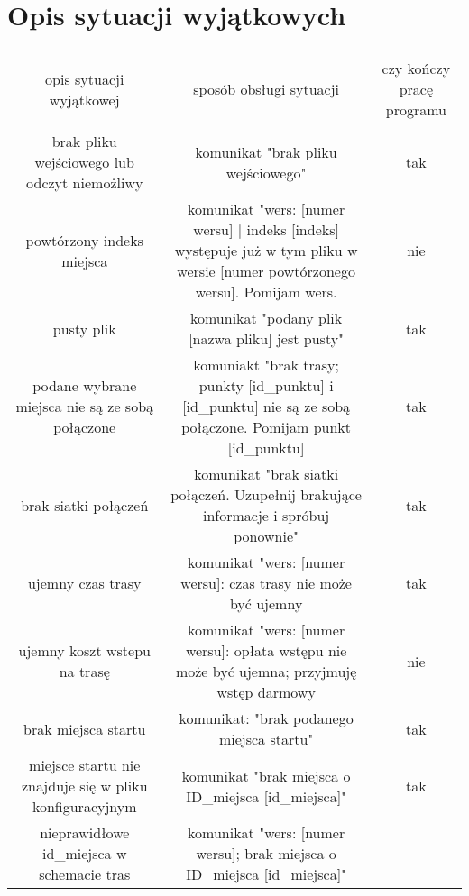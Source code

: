 \documentclass{article}
\begin{document}
\section{Opis sytuacji wyjątkowych}
\begin{tabular}{|c|c|c|} \hline
& & \\
opis sytuacji wyjątkowej & sposób obsługi sytuacji & czy kończy pracę programu \\ 
& & \\ \hline
brak pliku wejściowego lub odczyt niemożliwy & komunikat "brak pliku wejściowego" & tak\\ \hline
powtórzony indeks miejsca & komunikat "wers: [numer wersu] | indeks [indeks] występuje już w tym pliku w wersie [numer powtórzonego wersu]. Pomijam wers. & nie \\ \hline
pusty plik & komunikat "podany plik [nazwa pliku] jest pusty" & tak \\ \hline
podane wybrane miejsca nie są ze sobą połączone & komuniakt "brak trasy; punkty [id_punktu] i [id_punktu] nie są ze sobą połączone. Pomijam punkt [id_punktu] & tak \\ \hline
brak siatki połączeń & komunikat "brak siatki połączeń. Uzupełnij brakujące informacje i spróbuj ponownie" & tak\\ \hline
ujemny czas trasy & komunikat "wers: [numer wersu]: czas trasy nie może być ujemny & tak \\ \hline
ujemny koszt wstepu na trasę & komunikat "wers: [numer wersu]: opłata wstępu nie może być ujemna; przyjmuję wstęp darmowy  & nie \\ \hline
brak miejsca startu & komunikat: "brak podanego miejsca startu" & tak \\ \hline
miejsce startu nie znajduje się w pliku konfiguracyjnym & komunikat "brak miejsca o ID\_miejsca [id_miejsca]" & tak \\ \hline
nieprawidłowe id_miejsca w schemacie tras & komunikat "wers: [numer wersu]; brak miejsca o ID\_miejsca [id_miejsca]" & \\ \hline
\end{tabular}
\end{document}
